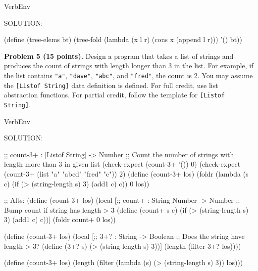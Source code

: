 \documentclass[12pt]{article}
\begin{document}
\vspace{1em}

\begin{SaveVerbatim}{VerbEnv}


SOLUTION:

(define (tree-elems bt)
  (tree-fold (lambda (x l r) (cons x (append l r))) '() bt))

\end{SaveVerbatim}


\newpage



\newpage
\noindent
{\bf Problem 5 (15 points).}  
%
Design a program that takes a list of strings and produces the count
of strings with length longer than 3 in the list.  For example, if the
list contains {\tt "a"}, {\tt "dave"}, {\tt "abc"}, and {\tt "fred"},
the count is 2.  You may assume the {\tt{[Listof String]}} data
definition is defined.
%
For full credit, use list abstraction functions.  For partial credit,
follow the template for {\tt{[Listof String]}}.


\begin{SaveVerbatim}{VerbEnv}


SOLUTION:

;; count-3+ : [Listof String] -> Number
;; Count the number of strings with length more than 3 in given list
(check-expect (count-3+ '()) 0)
(check-expect (count-3+ (list "a" "abcd" "fred" "c")) 2)
(define (count-3+ los)
  (foldr (lambda (s c) (if (> (string-length s) 3) (add1 c) c)) 0 los))

;; Alts:
(define (count-3+ los)
  (local [;; count+ : String Number -> Number
          ;; Bump count if string has length > 3
          (define (count+ s c) 
            (if (> (string-length s) 3) (add1 c) c))]
    (foldr count+ 0 los))

(define (count-3+ los)
  (local [;; 3+? : String -> Boolean
          ;; Does the string have length > 3?
          (define (3+? s) 
            (> (string-length s) 3))]
    (length (filter 3+? los))))

(define (count-3+ los)
  (length (filter (lambda (s) (> (string-length s) 3)) los)))
\end{SaveVerbatim}





\newpage
\end{document}
